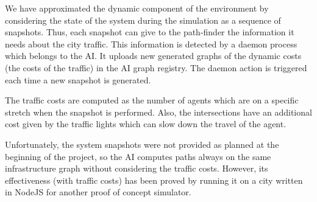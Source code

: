 
We have approximated the dynamic component of the environment by considering
the state of the system during the simulation as a sequence of snapshots.
Thus, each snapshot can give to the path-finder the information it needs
about the city traffic.
This information is detected by a daemon process which belongs to the AI.
It uploads new generated graphs of the dynamic costs (the costs of the traffic)
in the AI graph registry. The daemon action is triggered each time a new
snapshot is generated.

The traffic costs are computed as the number of agents which are on a specific
stretch when the snapshot is performed. Also, the intersections have an additional
cost given by the traffic lights which can slow down the travel of the agent.

Unfortunately, the system
snapshots were not provided as planned at the beginning of the project, so
the AI computes paths always on the same infrastructure graph without
considering the traffic costs. However, its effectiveness (with traffic costs)
has been proved by running it on a city written in NodeJS for another
proof of concept simulator.
